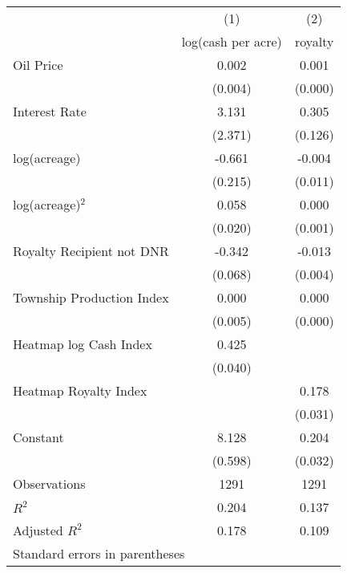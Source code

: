 \begin{tabular}{l*{2}{c}}
\hline\hline
                    &\multicolumn{1}{c}{(1)}&\multicolumn{1}{c}{(2)}\\
                    &\multicolumn{1}{c}{log(cash per acre)}&\multicolumn{1}{c}{royalty}\\
\hline
Oil Price           &       0.002&       0.001\\
                    &     (0.004)&     (0.000)\\
[1em]
Interest Rate       &       3.131&       0.305\\
                    &     (2.371)&     (0.126)\\
[1em]
log(acreage)        &      -0.661&      -0.004\\
                    &     (0.215)&     (0.011)\\
[1em]
log(acreage)$^2$    &       0.058&       0.000\\
                    &     (0.020)&     (0.001)\\
[1em]
Royalty Recipient not DNR&      -0.342&      -0.013\\
                    &     (0.068)&     (0.004)\\
[1em]
Township Production Index&       0.000&       0.000\\
                    &     (0.005)&     (0.000)\\
[1em]
Heatmap log Cash Index&       0.425&            \\
                    &     (0.040)&            \\
[1em]
Heatmap Royalty Index&            &       0.178\\
                    &            &     (0.031)\\
[1em]
Constant            &       8.128&       0.204\\
                    &     (0.598)&     (0.032)\\
\hline
Observations        &        1291&        1291\\
\(R^{2}\)           &       0.204&       0.137\\
Adjusted \(R^{2}\)  &       0.178&       0.109\\
\hline\hline
\multicolumn{3}{l}{\footnotesize Standard errors in parentheses}\\
\end{tabular}
